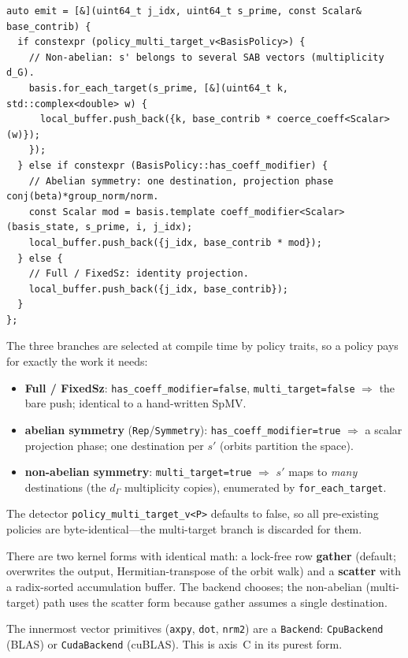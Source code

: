 \documentclass[11pt]{article}
\newcommand{\code}[1]{\texttt{\small #1}}
\begin{document}
\begin{lstlisting}
auto emit = [&](uint64_t j_idx, uint64_t s_prime, const Scalar& base_contrib) {
  if constexpr (policy_multi_target_v<BasisPolicy>) {
    // Non-abelian: s' belongs to several SAB vectors (multiplicity d_G).
    basis.for_each_target(s_prime, [&](uint64_t k, std::complex<double> w) {
      local_buffer.push_back({k, base_contrib * coerce_coeff<Scalar>(w)});
    });
  } else if constexpr (BasisPolicy::has_coeff_modifier) {
    // Abelian symmetry: one destination, projection phase conj(beta)*group_norm/norm.
    const Scalar mod = basis.template coeff_modifier<Scalar>(basis_state, s_prime, i, j_idx);
    local_buffer.push_back({j_idx, base_contrib * mod});
  } else {
    // Full / FixedSz: identity projection.
    local_buffer.push_back({j_idx, base_contrib});
  }
};
\end{lstlisting}

\noindent
The three branches are selected at compile time by policy traits, so a
policy pays for exactly the work it needs:
\begin{itemize}[nosep]
  \item \textbf{Full / FixedSz}: \code{has\_coeff\_modifier=false},
  \code{multi\_target=false} $\Rightarrow$ the bare push; identical to a
  hand-written SpMV.
  \item \textbf{abelian symmetry} (\code{Rep}/\code{Symmetry}):
  \code{has\_coeff\_modifier=true} $\Rightarrow$ a scalar projection
  phase; one destination per $s'$ (orbits partition the space).
  \item \textbf{non-abelian symmetry}: \code{multi\_target=true}
  $\Rightarrow$ $s'$ maps to \emph{many} destinations (the $d_\Gamma$
  multiplicity copies), enumerated by \code{for\_each\_target}.
\end{itemize}
The detector \code{policy\_multi\_target\_v<P>} defaults to false, so all
pre-existing policies are byte-identical---the multi-target branch is
discarded for them.

There are two kernel forms with identical math: a lock-free row
\textbf{gather} (default; overwrites the output, Hermitian-transpose of
the orbit walk) and a \textbf{scatter} with a radix-sorted accumulation
buffer. The backend chooses; the non-abelian (multi-target) path uses the
scatter form because gather assumes a single destination.

The innermost vector primitives (\code{axpy}, \code{dot}, \code{nrm2})
are a \code{Backend}: \code{CpuBackend} (BLAS) or \code{CudaBackend}
(cuBLAS). This is axis~C in its purest form.
\end{document}
